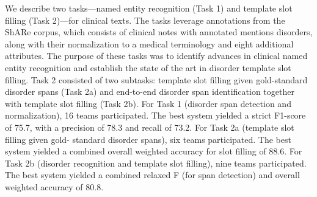 We describe two tasks—named entity recognition (Task 1) and template slot filling (Task 2)—for clinical texts. The tasks leverage annotations from the ShARe corpus, which consists of clinical notes with annotated mentions disorders, along with their normalization to a medical terminology and eight additional attributes. The purpose of these tasks was to identify advances in clinical named entity recognition and establish the state of the art in disorder template slot filling. Task 2 consisted of two subtasks: template slot filling given gold-standard disorder spans (Task 2a) and end-to-end disorder span identification together with template slot filling (Task 2b). For Task 1 (disorder span detection and normalization), 16 teams participated. The best system yielded a strict F1-score of 75.7, with a precision of 78.3 and recall of 73.2. For Task 2a (template slot filling given gold- standard disorder spans), six teams participated. The best system yielded a combined overall weighted accuracy for slot filling of 88.6. For Task 2b (disorder recognition and template slot filling), nine teams participated. The best system yielded a combined relaxed F (for span detection) and overall weighted accuracy of 80.8.
